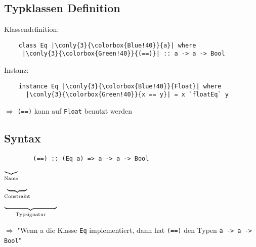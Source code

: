 \documentclass[
	aspectratio=169, 
	10pt 
]{beamer}
\newcommand\conly[2]{\only<#1>{#2}}
\begin{document}
\subsection{Typklassen Definition}
\begin{frame}[fragile]{\insertsubsection}
	
	Klassendefinition:
	\begin{verbatim}
	class Eq |\conly{3}{\colorbox{Blue!40}}{a}| where 
	 |\conly{3}{\colorbox{Green!40}}{(==)}| :: a -> a -> Bool
	\end{verbatim}

	\pause
	\bigskip
	\bigskip

	Instanz:
	\begin{verbatim}
	instance Eq |\conly{3}{\colorbox{Blue!40}}{Float}| where
	  |\conly{3}{\colorbox{Green!40}}{x == y}| = x `floatEq` y	
	\end{verbatim}

	\bigskip
	$\Rightarrow$ \texttt{(==)} kann auf \texttt{Float} benutzt werden 
\end{frame}


\subsection{Syntax}
\begin{frame}[fragile]{\insertsubsection}
	\begin{verbatim}
		(==) :: (Eq a) => a -> a -> Bool
	\end{verbatim}
	
	\vspace{-1.5em}
	\hspace{-0.1cm}
	$\underbrace{\hspace{0.5cm}}_{\text{Name}}$

	\vspace{-2.3em}
	\hspace{1.3cm}
	$\underbrace{\hspace{1.0cm}}_{\text{Constraint}}$

	\vspace{-2.3em}
	\hspace{3.2cm}
	$\underbrace{\hspace{2.6cm}}_{\text{Typsignatur}}$

	\pause
	\bigskip
	\bigskip

	$\Rightarrow$ "Wenn a die Klasse \texttt{Eq} implementiert, dann hat \texttt{(==)} den Typen \texttt{a -> a -> Bool}"

\end{frame}
\end{document}
